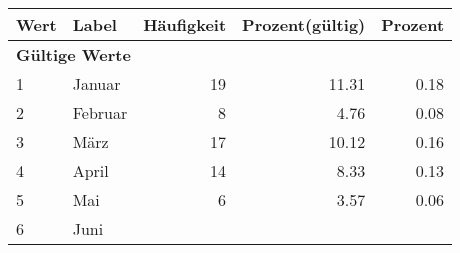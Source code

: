      \begin{longtable}{lXrrr}
     \toprule
     \textbf{Wert} & \textbf{Label} & \textbf{Häufigkeit} & \textbf{Prozent(gültig)} & \textbf{Prozent} \\
     \endhead
     \midrule
     \multicolumn{5}{l}{\textbf{Gültige Werte}}\\

     1 &
     \multicolumn{1}{X}{ Januar   } &


       \num{19} &
       \num[round-mode=places,round-precision=2]{11.31} &
         \num[round-mode=places,round-precision=2]{0.18} \\

     2 &
     \multicolumn{1}{X}{ Februar   } &


       \num{8} &
       \num[round-mode=places,round-precision=2]{4.76} &
         \num[round-mode=places,round-precision=2]{0.08} \\

     3 &
     \multicolumn{1}{X}{ März   } &


       \num{17} &
       \num[round-mode=places,round-precision=2]{10.12} &
         \num[round-mode=places,round-precision=2]{0.16} \\

     4 &
     \multicolumn{1}{X}{ April   } &


       \num{14} &
       \num[round-mode=places,round-precision=2]{8.33} &
         \num[round-mode=places,round-precision=2]{0.13} \\

     5 &
     \multicolumn{1}{X}{ Mai   } &


       \num{6} &
       \num[round-mode=places,round-precision=2]{3.57} &
         \num[round-mode=places,round-precision=2]{0.06} \\

     6 &
     \multicolumn{1}{X}{ Juni   } &



\end{longtable}
